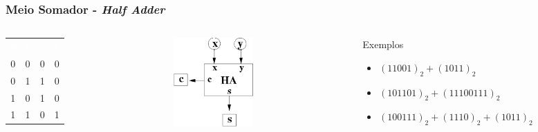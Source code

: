 \documentclass[aspectratio=169,
				xcolor=table]{beamer}
\begin{document}
		\begin{frame}
			\frametitle{Meio Somador - \textit{Half Adder}}
			\begin{columns}
				\begin{column}{0.3\textwidth}
					\begin{eftable}
						\begin{tabular}{c|c||c|c}		
							\textcolor{white}{x} & 
							\textcolor{white}{y} & 
							\textcolor{white}{s} & 
							\textcolor{white}{c} \\
							0 & 0 & 0 & 0 \\ 
							0 & 1 & 1 & 0 \\ 
							1 & 0 & 1 & 0 \\ 
							1 & 1 & 0 & 1 \\
						\end{tabular}		
					\end{eftable}				
				\end{column}
				\begin{column}{0.2\textwidth}
				\begin{figure}
					\hspace{-1cm}
					\includegraphics[height=3.4cm, keepaspectratio]{../figs/cap05/halfAdder.png} 
				\end{figure}
				\end{column}
				\begin{column}{0.5\textwidth}
					\begin{exampleblock}{Exemplos}
						\begin{itemize}
							\item $(11001)_2 + (1011)_2$ \\ 
							\item $(101101)_2 + (11100111)_2$ \\ 
							\item $(100111)_2 + (1110)_2 + (1011)_2 $			
						\end{itemize}
		
					\end{exampleblock}
				\end{column}
			\end{columns}
		\end{frame}
\end{document}
